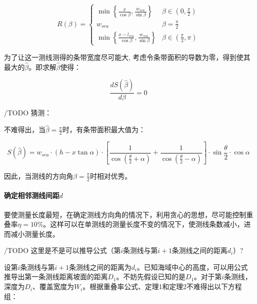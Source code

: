 \begin{equation}
    R(\beta) = 
    \begin{cases}
        \min \left \{
                \frac{x}{\cos \beta}, 
                \frac{w_{sea}}{\sin \beta}
            \right \}
        & \beta \in \left(0, \frac{\pi}{2} \right)\\
        w_{sea} & \beta = \frac{\pi}{2}\\
        \min \left \{
                \frac{x - l_{sea}}{\cos \beta}, 
                \frac{w_{sea}}{\sin \beta}
            \right \}
        & \beta \in \left(\frac{\pi}{2}, \pi \right) 
    \end{cases}
\end{equation}

为了让这一测线测得的条带宽度尽可能大, 考虑令条带面积的导数为零，得到使其最大的$\hat \beta$。即求解$\hat \beta$使得：

\begin{equation}
    \frac{dS(\hat \beta)}{d\beta} = 0
\end{equation}

/TODO 猜测：

不难得出，当$\hat \beta = \frac{\pi}{2}$时，有条带面积最大值为：

\begin{equation}
    S(\hat \beta) = 
    w_{sea} \cdot (h - x\tan \alpha) \cdot \left[
        \frac{1}{\cos \left(
            \frac{\theta}{2} + \alpha
        \right)} + \frac{1}{\cos \left(
            \frac{\theta}{2} - \alpha
        \right)}
    \right]\cdot \sin \frac{\theta}{2} \cdot \cos \alpha
\end{equation}

因此，当测线的方向角$\beta = \frac{\pi}{2}$时相对优秀。

\paragraph{确定相邻测线间距$d$}

要使测量长度最短，在确定测线方向角的情况下，利用贪心的思想，尽可能控制重叠率$\eta = 10\%$。这样可以在单测线的测量长度不变的情况下，使测线条数减小，进而减小测量长度。

/TODO 这里是不是可以推导公式（第$i$条测线与第$i+1$条测线之间的距离$d_i$）?

设第$i$条测线与第$i + 1$条测线之间的距离为$d_i$。已知海域中心的高度，可以用公式推导出第一条测线距离坡面的距离$D_1$。不妨先假设已知的是$D_1$。对于第$i$条测线，深度为$D_i$、覆盖宽度为$W_i$。根据重叠率公式、定理1和定理2不难得出以下方程组：


